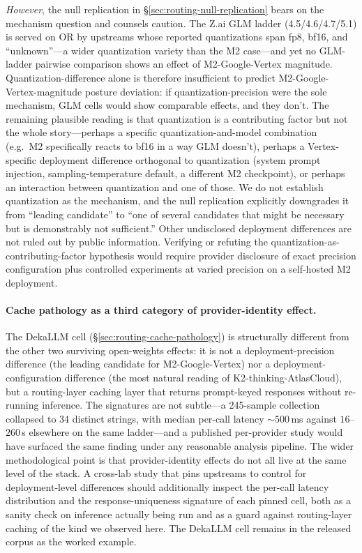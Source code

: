\documentclass[11pt,a4paper]{article}
\begin{document}
\emph{However}, the null replication in \S\ref{sec:routing-null-replication} bears on the mechanism question and counsels caution. The Z.ai GLM ladder (4.5/4.6/4.7/5.1) is served on OR by upstreams whose reported quantizations span fp8, bf16, and ``unknown''---a wider quantization variety than the M2 case---and yet no GLM-ladder pairwise comparison shows an effect of M2-Google-Vertex magnitude. Quantization-difference alone is therefore insufficient to predict M2-Google-Vertex-magnitude posture deviation: if quantization-precision were the sole mechanism, GLM cells would show comparable effects, and they don't. The remaining plausible reading is that quantization is a contributing factor but not the whole story---perhaps a specific quantization-and-model combination (e.g.\ M2 specifically reacts to bf16 in a way GLM doesn't), perhaps a Vertex-specific deployment difference orthogonal to quantization (system prompt injection, sampling-temperature default, a different M2 checkpoint), or perhaps an interaction between quantization and one of those. We do not establish quantization as the mechanism, and the null replication explicitly downgrades it from ``leading candidate'' to ``one of several candidates that might be necessary but is demonstrably not sufficient.'' Other undisclosed deployment differences are not ruled out by public information. Verifying or refuting the quantization-as-contributing-factor hypothesis would require provider disclosure of exact precision configuration plus controlled experiments at varied precision on a self-hosted M2 deployment.

\paragraph{Cache pathology as a third category of provider-identity effect.} The DekaLLM cell (\S\ref{sec:routing-cache-pathology}) is structurally different from the other two surviving open-weights effects: it is not a deployment-precision difference (the leading candidate for M2-Google-Vertex) nor a deployment-configuration difference (the most natural reading of K2-thinking-AtlasCloud), but a routing-layer caching layer that returns prompt-keyed responses without re-running inference. The signatures are not subtle---a 245-sample collection collapsed to 34 distinct strings, with median per-call latency ${\sim}500$\,ms against $16$--$260$\,s elsewhere on the same ladder---and a published per-provider study would have surfaced the same finding under any reasonable analysis pipeline. The wider methodological point is that provider-identity effects do not all live at the same level of the stack. A cross-lab study that pins upstreams to control for deployment-level differences should additionally inspect the per-call latency distribution and the response-uniqueness signature of each pinned cell, both as a sanity check on inference actually being run and as a guard against routing-layer caching of the kind we observed here. The DekaLLM cell remains in the released corpus as the worked example.
\end{document}

